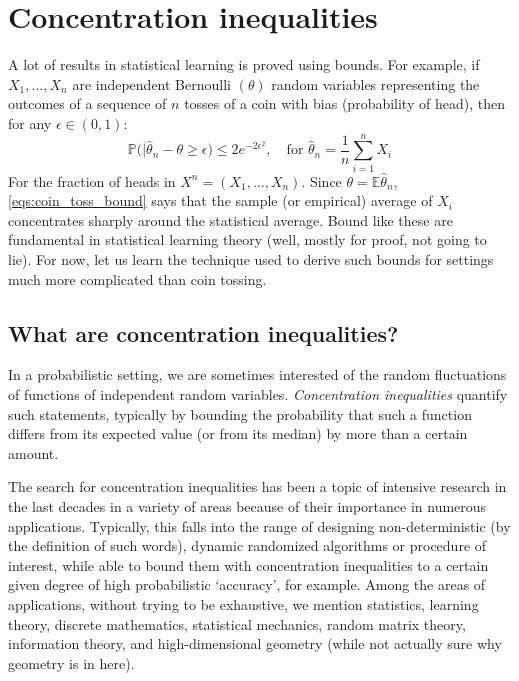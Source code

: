 \chapter{Concentration inequalities}
A lot of results in statistical learning is proved using bounds. For example, if $X_{1},\dots,X_n$ are independent Bernoulli $(\theta)$ random variables representing the outcomes of a sequence of $n$ tosses of a coin with bias (probability of head), then for any $\epsilon \in (0,1)$: 
\begin{equation}\label{eqs:coin_toss_bound}
    \mathbb{P} \Big(\lvert \hat{\theta}_{n} - \theta \geq \epsilon\Big) \leq 2e^{-2\epsilon^{2}}, \quad \text{for } \hat{\theta}_{n} = \frac{1}{n} \sum^{n}_{i=1} X_i
\end{equation}
For the fraction of heads in $X^n=(X_1,\dots,X_n)$. Since $\theta = \mathbb{E}\hat{\theta}_{n}$, \ref{eqs:coin_toss_bound} says that the sample (or empirical) average of $X_{i}$ concentrates sharply around the statistical average. Bound like these are fundamental in statistical learning theory (well, mostly for proof, not going to lie). For now, let us learn the technique used to derive such bounds for settings much more complicated than coin tossing. 

\section{What are concentration inequalities?}

In a probabilistic setting, we are sometimes interested of the random fluctuations of functions of independent random variables. \textit{Concentration inequalities} quantify such statements, typically by bounding the probability that such a function differs from its expected value (or from its median) by more than a certain amount. 

The search for concentration inequalities has been a topic of intensive research in the last decades in a variety of areas because of their importance in numerous applications. Typically, this falls into the range of designing non-deterministic (by the definition of such words), dynamic randomized algorithms or procedure of interest, while able to bound them with concentration inequalities to a certain given degree of high probabilistic `accuracy', for example. Among the areas of applications, without trying to be exhaustive, we mention statistics, learning theory, discrete mathematics, statistical mechanics, random matrix theory, information theory, and high-dimensional geometry (while not actually sure why geometry is in here). 


